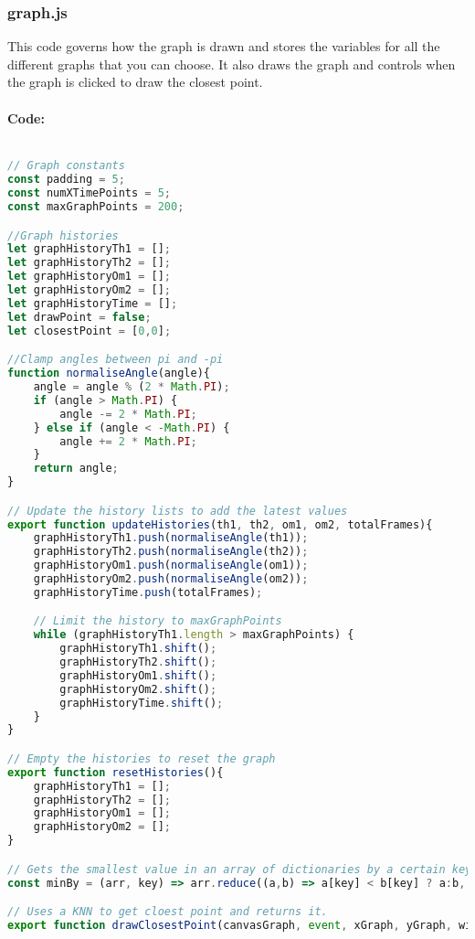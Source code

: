 \documentclass[12pt]{article}
\begin{document}
\subsubsection{graph.js}
This code governs how the graph is drawn and stores the variables for all the different graphs that you can choose. It also draws the graph and controls when the graph is clicked to draw the closest point.
\paragraph{Code:}
\begin{lstlisting}[language=JavaScript]

// Graph constants
const padding = 5;
const numXTimePoints = 5;
const maxGraphPoints = 200;

//Graph histories
let graphHistoryTh1 = [];
let graphHistoryTh2 = [];
let graphHistoryOm1 = [];
let graphHistoryOm2 = [];
let graphHistoryTime = [];
let drawPoint = false;
let closestPoint = [0,0];

//Clamp angles between pi and -pi
function normaliseAngle(angle){
    angle = angle % (2 * Math.PI);
    if (angle > Math.PI) {
        angle -= 2 * Math.PI;
    } else if (angle < -Math.PI) {
        angle += 2 * Math.PI;
    }
    return angle;
}

// Update the history lists to add the latest values
export function updateHistories(th1, th2, om1, om2, totalFrames){
    graphHistoryTh1.push(normaliseAngle(th1));
    graphHistoryTh2.push(normaliseAngle(th2));
    graphHistoryOm1.push(normaliseAngle(om1));
    graphHistoryOm2.push(normaliseAngle(om2));
    graphHistoryTime.push(totalFrames);

    // Limit the history to maxGraphPoints
    while (graphHistoryTh1.length > maxGraphPoints) {
        graphHistoryTh1.shift();
        graphHistoryTh2.shift();
        graphHistoryOm1.shift();
        graphHistoryOm2.shift();
        graphHistoryTime.shift();
    }
}

// Empty the histories to reset the graph
export function resetHistories(){
    graphHistoryTh1 = [];
    graphHistoryTh2 = [];
    graphHistoryOm1 = [];
    graphHistoryOm2 = [];
}

// Gets the smallest value in an array of dictionaries by a certain key
const minBy = (arr, key) => arr.reduce((a,b) => a[key] < b[key] ? a:b, {});

// Uses a KNN to get cloest point and returns it.
export function drawClosestPoint(canvasGraph, event, xGraph, yGraph, widthGraph, heightGraph){


\end{lstlisting}
\end{document}
